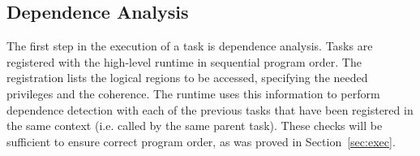 \subsection{Dependence Analysis} 
\label{subsec:depanalysis}
The first step in the execution of a task is dependence analysis.  Tasks are
registered with the high-level runtime in sequential program order.  The
registration lists the logical
regions to be accessed, specifying the needed privileges and the coherence.
The runtime uses this information to perform
dependence detection with each of the previous tasks that have been registered
in the same context (i.e. called by the same parent task).  These checks will
be sufficient to ensure correct program order, as was proved in Section~\ref{sec:exec}. 


